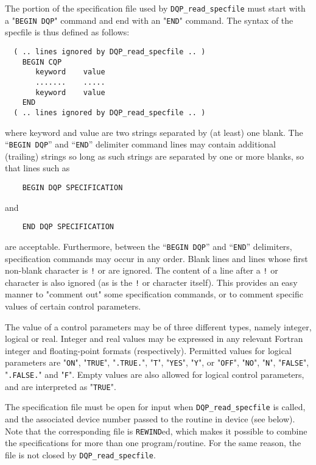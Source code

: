 \documentclass{galahad}
\newcommand{\packagename}{DQP}
\begin{document}
The portion of the specification file used by
{\tt \packagename\_read\_specfile}
must start
with a "{\tt BEGIN \packagename}" command and end with an
"{\tt END}" command.  The syntax of the specfile is thus defined as follows:
\begin{verbatim}
  ( .. lines ignored by DQP_read_specfile .. )
    BEGIN CQP
       keyword    value
       .......    .....
       keyword    value
    END
  ( .. lines ignored by DQP_read_specfile .. )
\end{verbatim}
where keyword and value are two strings separated by (at least) one blank.
The ``{\tt BEGIN \packagename}'' and ``{\tt END}'' delimiter command lines
may contain additional (trailing) strings so long as such strings are
separated by one or more blanks, so that lines such as
\begin{verbatim}
    BEGIN DQP SPECIFICATION
\end{verbatim}
and
\begin{verbatim}
    END DQP SPECIFICATION
\end{verbatim}
are acceptable. Furthermore,
between the
``{\tt BEGIN \packagename}'' and ``{\tt END}'' delimiters,
specification commands may occur in any order.  Blank lines and
lines whose first non-blank character is {\tt !} or {\tt *} are ignored.
The content
of a line after a {\tt !} or {\tt *} character is also
ignored (as is the {\tt !} or {\tt *}
character itself). This provides an easy manner to "comment out" some
specification commands, or to comment specific values
of certain control parameters.

The value of a control parameters may be of three different types, namely
integer, logical or real.
Integer and real values may be expressed in any relevant Fortran integer and
floating-point formats (respectively). Permitted values for logical
parameters are "{\tt ON}", "{\tt TRUE}", "{\tt .TRUE.}", "{\tt T}",
"{\tt YES}", "{\tt Y}", or "{\tt OFF}", "{\tt NO}",
"{\tt N}", "{\tt FALSE}", "{\tt .FALSE.}" and "{\tt F}".
Empty values are also allowed for
logical control parameters, and are interpreted as "{\tt TRUE}".

The specification file must be open for
input when {\tt \packagename\_read\_specfile}
is called, and the associated device number
passed to the routine in device (see below).
Note that the corresponding
file is {\tt REWIND}ed, which makes it possible to combine the specifications
for more than one program/routine.  For the same reason, the file is not
closed by {\tt \packagename\_read\_specfile}.
\end{document}
